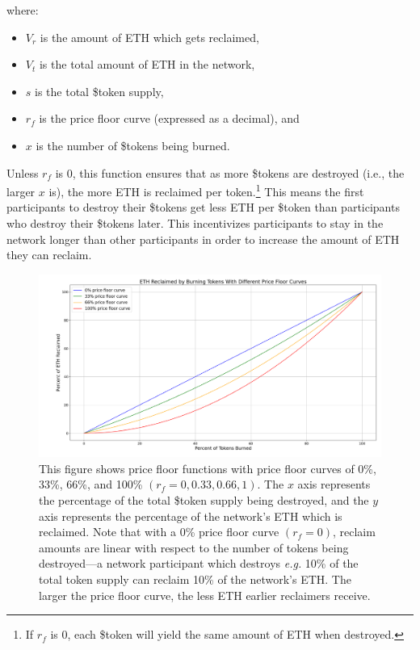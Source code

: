 \documentclass{article}
\begin{document}
where:
\begin{itemize}
  \item $V_r$ is the amount of ETH which gets reclaimed,
  \item $V_t$ is the total amount of ETH in the network,
  \item $s$ is the total \$token supply,
  \item $r_f$ is the price floor curve (expressed as a decimal), and
  \item $x$ is the number of \$tokens being burned.
\end{itemize}

Unless $r_f$ is 0, this function ensures that as more \$tokens are destroyed (i.e., the larger $x$ is), the more ETH is reclaimed per token.\footnote{If $r_f$ is 0, each \$token will yield the same amount of ETH when destroyed.} This means the first participants to destroy their \$tokens get less ETH per \$token than participants who destroy their \$tokens later. This incentivizes participants to stay in the network longer than other participants in order to increase the amount of ETH they can reclaim.

\begin{figure}[ht]
  \centering
  \includegraphics[width=\textwidth]{figures/multi-floor-curves.png}
  \caption{This figure shows price floor functions with price floor curves of 0\%, 33\%, 66\%, and 100\% $(r_f = 0, 0.33, 0.66, 1)$. The $x$ axis represents the percentage of the total \$token supply being destroyed, and the $y$ axis represents the percentage of the network's ETH which is reclaimed. Note that with a 0\% price floor curve $(r_f = 0)$, reclaim amounts are linear with respect to the number of tokens being destroyed---a network participant which destroys \textit{e.g.} 10\% of the total token supply can reclaim 10\% of the network's ETH. The larger the price floor curve, the less ETH earlier reclaimers receive.}
\end{figure}
\end{document}

